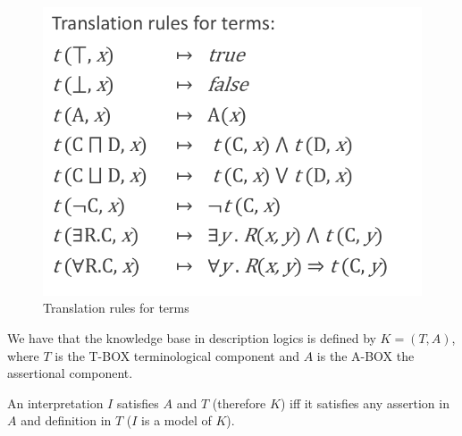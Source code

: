 \begin{figure}
	\includegraphics[width=\textwidth]{Images/termTranslation}
	\caption{Translation rules for terms}
	\label{img:termTranslatin}
\end{figure}
We have that the knowledge base in description logics is defined by $K = (T, A)$, where
$T$ is the T-BOX terminological component and $A$ is the A-BOX the assertional component.

An interpretation $I$ satisfies $A$ and $T$ (therefore $K$) iff it satisfies 
any assertion in $A$ and definition in $T$ ($I$ is a model of $K$).\newline

